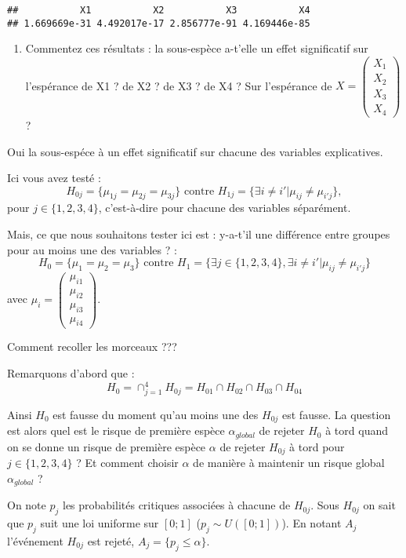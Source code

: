 \documentclass[
]{article}
\providecommand{\tightlist}{%
  \setlength{\itemsep}{0pt}\setlength{\parskip}{0pt}}
\begin{document}
\begin{verbatim}
##           X1           X2           X3           X4 
## 1.669669e-31 4.492017e-17 2.856777e-91 4.169446e-85
\end{verbatim}

\begin{enumerate}
\def\labelenumi{\arabic{enumi}.}
\setcounter{enumi}{6}
\tightlist
\item
  Commentez ces résultats : la sous-espèce a-t'elle un effet
  significatif sur l'espérance de X1 ? de X2 ? de X3 ? de X4 ? Sur
  l'espérance de
  \(X = \begin{pmatrix} X_1 \\ X_2 \\ X_3 \\ X_4 \end{pmatrix}\) ?
\end{enumerate}

Oui la sous-espéce à un effet significatif sur chacune des variables
explicatives.

Ici vous avez testé : \[
H_{0j} = \{ \mu_{1j} = \mu_{2j} = \mu_{3j} \} \mbox{ contre } H_{1j} = \{\exists i \neq i'|  \mu_{ij} \neq \mu_{i'j} \},
\] pour \(j \in \{1,2,3,4\}\), c'est-à-dire pour chacune des variables
séparément.

Mais, ce que nous souhaitons tester ici est : y-a-t'il une différence
entre groupes pour au moins une des variables ? : \[
H_{0} = \{ \mu_{1} = \mu_{2} = \mu_{3} \} \mbox{ contre } H_{1} = \{\exists j \in \{1,2,3,4\}, \exists i \neq i'|  \mu_{ij} \neq \mu_{i'j} \}
\] avec
\(\mu_i = \begin{pmatrix} \mu_{i1} \\ \mu_{i2} \\ \mu_{i3} \\ \mu_{i4}\end{pmatrix}\).

Comment recoller les morceaux ???

Remarquons d'abord que : \[
H_0 = \cap_{j=1}^{4} H_{0j} = H_{01} \cap H_{02} \cap H_{03} \cap H_{04}
\]

Ainsi \(H_0\) est fausse du moment qu'au moins une des \(H_{0j}\) est
fausse. La question est alors quel est le risque de première espèce
\(\alpha_{global}\) de rejeter \(H_0\) à tord quand on se donne un
risque de première espèce \(\alpha\) de rejeter \(H_{0j}\) à tord pour
\(j \in \{1,2,3,4\}\) ? Et comment choisir \(\alpha\) de manière à
maintenir un risque global \(\alpha_{global}\) ?

On note \(p_j\) les probabilités critiques associées à chacune de
\(H_{0j}\). Sous \(H_{0j}\) on sait que \(p_j\) suit une loi uniforme
sur \([0;1]\) (\(p_j \sim U([0;1])\)). En notant \(A_j\) l'événement
\(H_{0j}\) est rejeté, \(A_j = \{p_j \leq \alpha \}\).
\end{document}

